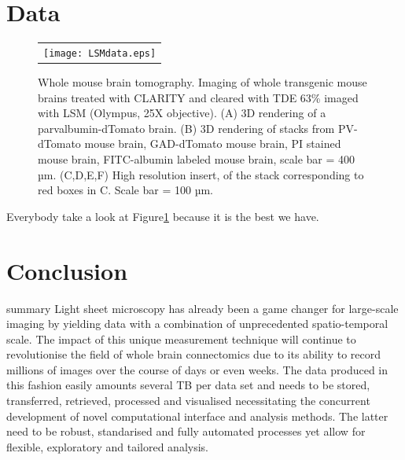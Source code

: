 \documentclass[12pt]{spieman}  %
\begin{document}
\section{Data}

	\begin{figure}
   \begin{center}
   \begin{tabular}{c}
   \texttt{[image: LSMdata.eps]}
   \end{tabular}
   \end{center}
   \caption{\label{fig:LSMdata} Whole mouse brain tomography. Imaging of whole transgenic mouse brains treated with CLARITY and cleared with TDE 63\% imaged with LSM (Olympus, 25X objective). (A) 3D rendering of a parvalbumin-dTomato brain. (B) 3D rendering of stacks from PV-dTomato mouse brain, GAD-dTomato mouse brain,  PI stained mouse brain, FITC-albumin labeled mouse brain, scale bar = 400 µm. (C,D,E,F) High resolution insert, of the stack corresponding to red boxes in C. Scale bar = 100 µm.} 
   \end{figure}
	
	Everybody take a look at Figure\ref{fig:LSMdata} because it is the best we have. 

\section{Conclusion}
summary
Light sheet microscopy has already been a game changer for large-scale imaging by yielding data with a combination of unprecedented spatio-temporal scale. The impact of this unique measurement technique will continue to revolutionise the field of whole brain connectomics due to its ability to record millions of images over the course of days or even weeks. The data produced in this fashion easily amounts several TB per data set and needs to be stored, transferred, retrieved, processed and visualised necessitating the concurrent development of novel computational interface and analysis methods. The latter need to be robust, standarised and fully automated processes yet allow for flexible, exploratory and tailored analysis. 
\end{document}
